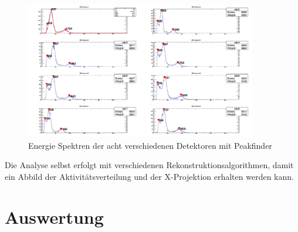 \begin{figure}[h!]
	\centering
	\includegraphics[width=0.9\textwidth]{Energiekalibration.png}
	\caption{Energie Spektren der acht verschiedenen Detektoren mit Peakfinder}
	\label{Kali}
\end{figure}

Die Analyse selbst erfolgt mit verschiedenen Rekonstruktionsalgorithmen, damit ein Abbild der Aktivitätsverteilung und der X-Projektion erhalten werden kann.

\section{Auswertung}
